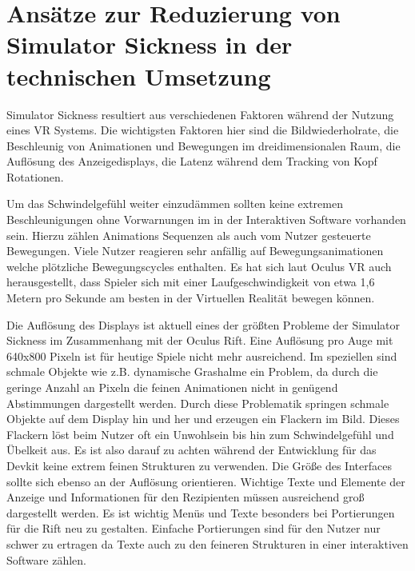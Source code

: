 \documentclass[pagesize, paper=a4, fontsize=12pt,titlepage=true, headings=small, headnosepline, abstractoff, liststotoc, nochapterprefix, plainheadsepline]{scrreprt}
\begin{document}
\section{Ansätze zur Reduzierung von Simulator Sickness in der technischen Umsetzung}
Simulator Sickness resultiert aus verschiedenen Faktoren während der Nutzung eines VR Systems. Die wichtigsten Faktoren hier sind die Bildwiederholrate, die Beschleunig von Animationen und Bewegungen im dreidimensionalen Raum, die Auflösung des Anzeigedisplays, die Latenz während dem Tracking von Kopf Rotationen. 

Um das Schwindelgefühl weiter einzudämmen sollten keine extremen Beschleunigungen ohne Vorwarnungen im in der Interaktiven Software vorhanden sein. Hierzu zählen Animations Sequenzen als auch vom Nutzer gesteuerte Bewegungen. Viele Nutzer reagieren sehr anfällig auf Bewegungsanimationen welche plötzliche Bewegungscycles enthalten. Es hat sich laut Oculus VR auch herausgestellt, dass Spieler sich mit einer Laufgeschwindigkeit von etwa 1,6 Metern pro Sekunde am besten in der Virtuellen Realität bewegen können.

Die Auflösung des Displays ist aktuell eines der größten Probleme der Simulator Sickness im Zusammenhang mit der Oculus Rift.  Eine Auflösung pro Auge mit 640x800 Pixeln ist für heutige Spiele nicht mehr ausreichend. Im speziellen sind schmale Objekte wie z.B. dynamische Grashalme ein Problem, da durch die geringe Anzahl an Pixeln die feinen Animationen nicht in genügend Abstimmungen dargestellt werden. Durch diese Problematik springen schmale Objekte auf dem Display hin und her und erzeugen ein Flackern im Bild. Dieses Flackern löst beim Nutzer oft ein Unwohlsein bis hin zum Schwindelgefühl und Übelkeit aus. Es ist also darauf zu achten während der Entwicklung für das Devkit keine extrem feinen Strukturen zu verwenden. Die Größe des Interfaces sollte sich ebenso an der Auflösung orientieren. Wichtige Texte und Elemente der Anzeige und Informationen für den Rezipienten müssen ausreichend groß dargestellt werden. Es ist wichtig Menüs und Texte besonders bei Portierungen für die Rift neu zu gestalten. Einfache Portierungen sind für den Nutzer nur schwer zu ertragen da Texte auch zu den feineren Strukturen in einer interaktiven Software zählen.
\end{document}
